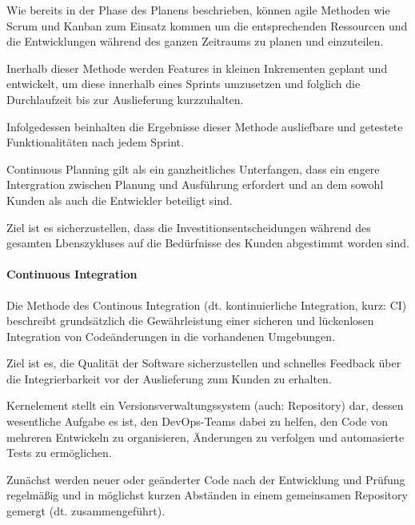 Wie bereits in der Phase des Planens beschrieben, können agile Methoden wie Scrum und Kanban zum Einsatz kommen um die entsprechenden Ressourcen und die Entwicklungen während des ganzen Zeitraums zu planen und einzuteilen.

Inerhalb dieser Methode werden Features in kleinen Inkrementen geplant und entwickelt, um diese innerhalb eines Sprints umzusetzen und folglich die Durchlaufzeit bis zur Auslieferung kurzzuhalten. \cite[S. 266]{tokarski_strategische_2018} 

Infolgedessen beinhalten die Ergebnisse dieser Methode ausliefbare und getestete Funktionalitäten nach jedem Sprint. 

Continuous Planning gilt als ein ganzheitliches Unterfangen, dass ein engere Intergration zwischen Planung und Ausführung erfordert und an dem sowohl Kunden als auch die Entwickler beteiligt sind. \cite{fitzgerald_continuous_2014} 

Ziel ist es sicherzustellen, dass die Investitionsentscheidungen während des gesamten Lbenszykluses auf die Bedürfnisse des Kunden abgestimmt worden sind. 

\paragraph{Continuous Integration}
Die Methode des Continous Integration (dt. kontinuierliche Integration, kurz: CI) beschreibt grundsätzlich die Gewährleistung einer sicheren und lückenlosen Integration von Codeänderungen in die vorhandenen Umgebungen. \cite[S. 266]{tokarski_strategische_2018}  

Ziel ist es, die Qualität der Software sicherzustellen und schnelles Feedback über die Integrierbarkeit vor der Auslieferung zum Kunden zu erhalten. \cite[S. 266]{tokarski_strategische_2018} 

Kernelement stellt ein Versionsverwaltungssystem (auch: Repository) dar, dessen wesentliche Aufgabe es ist, den DevOps-Teams dabei zu helfen, den Code von mehreren Entwickeln zu organisieren, Änderungen zu verfolgen und automasierte Tests zu ermöglichen. 

Zunächst werden neuer oder geänderter Code nach der Entwicklung und Prüfung regelmäßig und in möglichst kurzen Abständen in einem gemeinsamen Repository gemergt (dt. zusammengeführt). \cite[S. 13-16]{sharma_devops_2017}


